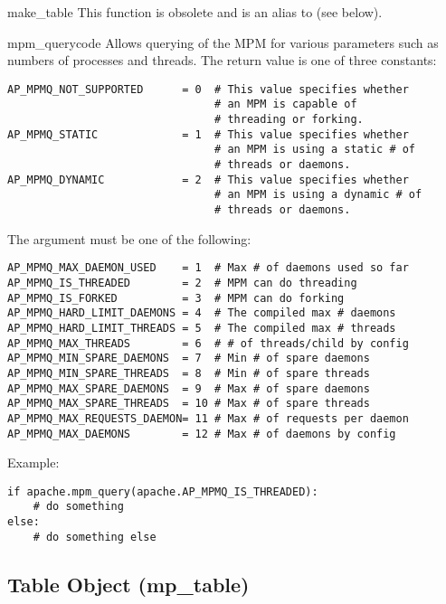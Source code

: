 \begin{funcdesc}{make_table}{} 
  This function is obsolete and is an alias to  (see below).
\end{funcdesc}

\begin{funcdesc}{mpm_query}{code}
  Allows querying of the MPM for various parameters such as numbers of
  processes and threads. The return value is one of three constants:
  \begin{verbatim}
AP_MPMQ_NOT_SUPPORTED      = 0  # This value specifies whether 
                                # an MPM is capable of         
                                # threading or forking.        
AP_MPMQ_STATIC             = 1  # This value specifies whether 
                                # an MPM is using a static # of
                                # threads or daemons.          
AP_MPMQ_DYNAMIC            = 2  # This value specifies whether 
                                # an MPM is using a dynamic # of
                                # threads or daemons.          
  \end{verbatim}

  The  argument must be one of the following:
  \begin{verbatim}
AP_MPMQ_MAX_DAEMON_USED    = 1  # Max # of daemons used so far 
AP_MPMQ_IS_THREADED        = 2  # MPM can do threading         
AP_MPMQ_IS_FORKED          = 3  # MPM can do forking           
AP_MPMQ_HARD_LIMIT_DAEMONS = 4  # The compiled max # daemons   
AP_MPMQ_HARD_LIMIT_THREADS = 5  # The compiled max # threads   
AP_MPMQ_MAX_THREADS        = 6  # # of threads/child by config 
AP_MPMQ_MIN_SPARE_DAEMONS  = 7  # Min # of spare daemons       
AP_MPMQ_MIN_SPARE_THREADS  = 8  # Min # of spare threads       
AP_MPMQ_MAX_SPARE_DAEMONS  = 9  # Max # of spare daemons       
AP_MPMQ_MAX_SPARE_THREADS  = 10 # Max # of spare threads       
AP_MPMQ_MAX_REQUESTS_DAEMON= 11 # Max # of requests per daemon 
AP_MPMQ_MAX_DAEMONS        = 12 # Max # of daemons by config   
  \end{verbatim}

Example:
  \begin{verbatim}
if apache.mpm_query(apache.AP_MPMQ_IS_THREADED):
    # do something
else:
    # do something else
  \end{verbatim}
\end{funcdesc}

\subsection{Table Object (mp_table)\label{pyapi-mptable}}

